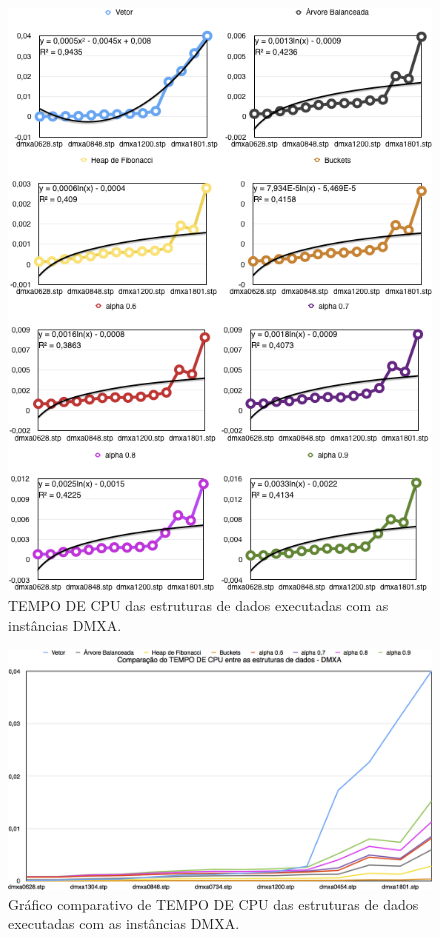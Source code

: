 \documentclass[
	12pt,				%
	oneside,			%
	a4paper,			%
	english,			%
	french,				%
	spanish,			%
	brazil,				%
	]{abntex2}
\begin{document}
\begin{figure}
 \centering
 \includegraphics[width=6.4in]{charts/cpu_all_dmxa.png}
 \caption{TEMPO DE CPU das estruturas de dados executadas com as instâncias DMXA.}
 \label{fig:DmxaGraphTime}
\end{figure}

\begin{figure}[H]
 \centering
 \includegraphics[width=6.4in]{charts/comp_ed_dmxa.png}
 \caption{Gráfico comparativo de TEMPO DE CPU das estruturas de dados executadas com as instâncias DMXA.}
 \label{fig:AlueGraphTimeAll}
\end{figure}
\end{document}
